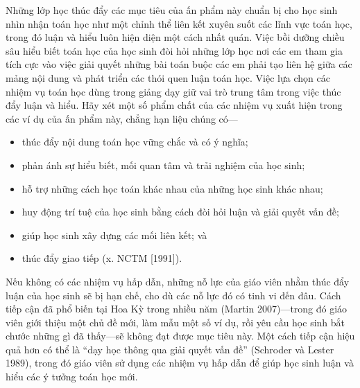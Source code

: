 \documentclass[
  10pt,
  a4paper,
  landscape,
  twoside,
  openany
]{scrbook}
\newcommand{\VI}[1]{#1}
\newcommand{\NOTE}[1]{#1}
\begin{document}
{
\VI{Những lớp học thúc đẩy các mục tiêu của ấn phẩm này chuẩn bị cho học sinh nhìn nhận toán học như một chỉnh thể liên kết xuyên suốt các lĩnh vực toán học, trong đó luận và hiểu luôn hiện diện một cách nhất quán. Việc bồi dưỡng chiều sâu hiểu biết toán học của học sinh đòi hỏi những lớp học nơi các em tham gia tích cực vào việc giải quyết những bài toán buộc các em phải tạo liên hệ giữa các mảng nội dung và phát triển các thói quen luận toán học. Việc lựa chọn các nhiệm vụ toán học dùng trong giảng dạy giữ vai trò trung tâm trong việc thúc đẩy luận và hiểu. Hãy xét một số phẩm chất của các nhiệm vụ xuất hiện trong các ví dụ của ấn phẩm này, chẳng hạn liệu chúng có---

\begin{itemize}
  \item thúc đẩy nội dung toán học vững chắc và có ý nghĩa;
  \item phản ánh sự hiểu biết, mối quan tâm và trải nghiệm của học sinh;
  \item hỗ trợ những cách học toán khác nhau của những học sinh khác nhau;
  \item huy động trí tuệ của học sinh bằng cách đòi hỏi luận và giải quyết vấn đề;
  \item giúp học sinh xây dựng các mối liên kết; và
  \item thúc đẩy giao tiếp (x. NCTM [1991]).
\end{itemize}

Nếu không có các nhiệm vụ hấp dẫn, những nỗ lực của giáo viên nhằm thúc đẩy luận của học sinh sẽ bị hạn chế, cho dù các nỗ lực đó có tinh vi đến đâu. Cách tiếp cận đã phổ biến tại Hoa Kỳ trong nhiều năm (Martin 2007)---trong đó giáo viên giới thiệu một chủ đề mới, làm mẫu một số ví dụ, rồi yêu cầu học sinh bắt chước những gì đã thấy---sẽ không đạt được mục tiêu này. Một cách tiếp cận hiệu quả hơn có thể là ``dạy học thông qua giải quyết vấn đề'' (Schroder và Lester 1989), trong đó giáo viên sử dụng các nhiệm vụ hấp dẫn để giúp học sinh luận và hiểu các ý tưởng toán học mới.}
}
{
\NOTE{}
}
\end{document}
